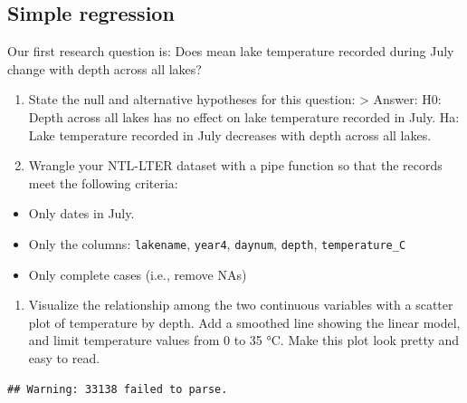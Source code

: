 \documentclass[
]{article}
\newenvironment{Shaded}{\begin{snugshade}}{\end{snugshade}}
\newcommand{\CommentTok}[1]{\textcolor[rgb]{0.56,0.35,0.01}{\textit{#1}}}
\newcommand{\FunctionTok}[1]{\textcolor[rgb]{0.13,0.29,0.53}{\textbf{#1}}}
\newcommand{\NormalTok}[1]{#1}
\newcommand{\OtherTok}[1]{\textcolor[rgb]{0.56,0.35,0.01}{#1}}
\newcommand{\SpecialCharTok}[1]{\textcolor[rgb]{0.81,0.36,0.00}{\textbf{#1}}}
\providecommand{\tightlist}{%
  \setlength{\itemsep}{0pt}\setlength{\parskip}{0pt}}
\begin{document}
\subsection{Simple regression}\label{simple-regression}

Our first research question is: Does mean lake temperature recorded
during July change with depth across all lakes?

\begin{enumerate}
\def\labelenumi{\arabic{enumi}.}
\setcounter{enumi}{2}
\item
  State the null and alternative hypotheses for this question:
  \textgreater{} Answer: H0: Depth across all lakes has no effect on
  lake temperature recorded in July. Ha: Lake temperature recorded in
  July decreases with depth across all lakes.
\item
  Wrangle your NTL-LTER dataset with a pipe function so that the records
  meet the following criteria:
\end{enumerate}

\begin{itemize}
\tightlist
\item
  Only dates in July.
\item
  Only the columns: \texttt{lakename}, \texttt{year4}, \texttt{daynum},
  \texttt{depth}, \texttt{temperature\_C}
\item
  Only complete cases (i.e., remove NAs)
\end{itemize}

\begin{enumerate}
\def\labelenumi{\arabic{enumi}.}
\setcounter{enumi}{4}
\tightlist
\item
  Visualize the relationship among the two continuous variables with a
  scatter plot of temperature by depth. Add a smoothed line showing the
  linear model, and limit temperature values from 0 to 35 °C. Make this
  plot look pretty and easy to read.
\end{enumerate}

\begin{Shaded}
\end{Shaded}

\begin{verbatim}
## Warning: 33138 failed to parse.
\end{verbatim}
\end{document}
